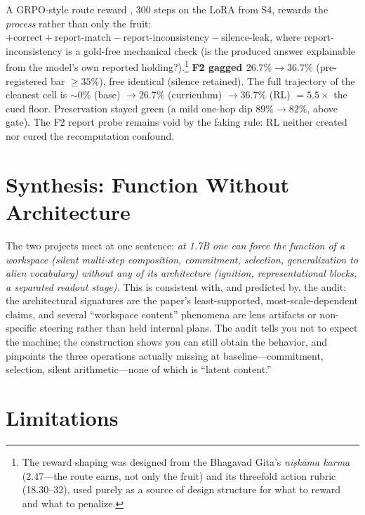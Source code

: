 \documentclass[11pt]{article}
\newcommand{\pct}{\%}
\begin{document}
A GRPO-style route reward \cite{grpo}, 300 steps on the LoRA from S4, rewards the
\emph{process} rather than only the fruit: $+\text{correct}+\text{report-match}
-\text{report-inconsistency}-\text{silence-leak}$, where report-inconsistency is
a gold-free mechanical check (is the produced answer explainable from the model's
own reported holding?).\footnote{The reward shaping was designed from the
Bhagavad Gita's \emph{ni\d{s}k\={a}ma karma} (2.47---the route earns, not only the
fruit) and its threefold action rubric (18.30--32), used purely as a source of
design structure for what to reward and what to penalize.} \textbf{F2 gagged
$26.7\pct \to 36.7\pct$} (pre-registered bar $\geq35\pct$), free identical
(silence retained). The full trajectory of the cleanest cell is $\sim0\pct$
(base) $\to 26.7\pct$ (curriculum) $\to 36.7\pct$ (RL) $= 5.5\times$ the cued
floor. Preservation stayed green (a mild one-hop dip $89\pct{\to}82\pct$, above
gate). The F2 report probe remains void by the faking rule: RL neither created nor
cured the recomputation confound.

\section{Synthesis: Function Without Architecture}

The two projects meet at one sentence: \emph{at 1.7B one can force the function of
a workspace (silent multi-step composition, commitment, selection, generalization
to alien vocabulary) without any of its architecture (ignition, representational
blocks, a separated readout stage).} This is consistent with, and predicted by,
the audit: the architectural signatures are the paper's least-supported,
most-scale-dependent claims, and several ``workspace content'' phenomena are lens
artifacts or non-specific steering rather than held internal plans. The audit
tells you not to expect the machine; the construction shows you can still obtain
the behavior, and pinpoints the three operations actually missing at
baseline---commitment, selection, silent arithmetic---none of which is ``latent
content.''

\section{Limitations}
\end{document}

